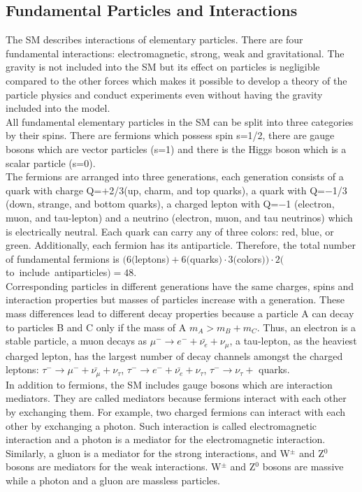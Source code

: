 \subsection{Fundamental Particles and Interactions}
\label{sec:Intro_FundParticles}

The SM describes interactions of elementary particles. There are four fundamental interactions: electromagnetic, strong, weak and gravitational. The gravity is not included into the SM but its effect on particles is negligible compared to the other forces which makes it possible to develop a theory of the particle physics and conduct experiments even without having the gravity included into the model.\\ 

All fundamental elementary particles in the SM can be split into three categories by their spins. There are fermions which possess spin s=1/2, there are gauge bosons which are vector particles (s=1) and there is the Higgs boson which is a scalar particle (s=0). \\

The fermions are arranged into three generations, each generation consists of a quark with charge Q=$+$2/3(up, charm, and top quarks), a quark with Q=$-$1/3 (down, strange, and bottom quarks), a charged lepton with Q=$-$1 (electron, muon, and tau-lepton) and a neutrino (electron, muon, and tau neutrinos) which is electrically neutral. Each quark can carry any of three colors: red, blue, or green. Additionally, each fermion has its antiparticle. Therefore, the total number of fundamental fermions is $(6 ($leptons$)+6 ($quarks$) \cdot 3 ($colors$) ) \cdot 2 ($to~include~antiparticles$) = 48$.\\ 

Corresponding particles in different generations have the same charges, spins and interaction properties but masses of particles increase with a generation. These mass differences lead to different decay properties because a particle A can decay to particles B and C only if the mass of A $m_A > m_B + m_C$. Thus, an electron is a stable particle, a muon decays as $\mu^- \rightarrow e^- + \bar{\nu_e} + \nu_\mu$, a tau-lepton, as the heaviest charged lepton, has the largest number of decay channels amongst the charged leptons: $\tau^- \rightarrow \mu^- + \bar{\nu_\mu} + \nu_\tau$, $\tau^- \rightarrow e^- + \bar{\nu_e} + \nu_\tau$,  $\tau^- \rightarrow \nu_\tau +$ quarks. \\

In addition to fermions, the SM includes gauge bosons which are interaction mediators. They are called mediators because fermions interact with each other by exchanging them. For example, two charged fermions can interact with each other by exchanging a photon. Such interaction is called electromagnetic interaction and a photon is a mediator for the electromagnetic interaction. Similarly, a gluon is a mediator for the strong interactions, and W$^{\pm}$ and Z$^0$ bosons are mediators for the weak interactions. W$^{\pm}$ and Z$^0$ bosons are massive while a photon and a gluon are massless particles. \\

